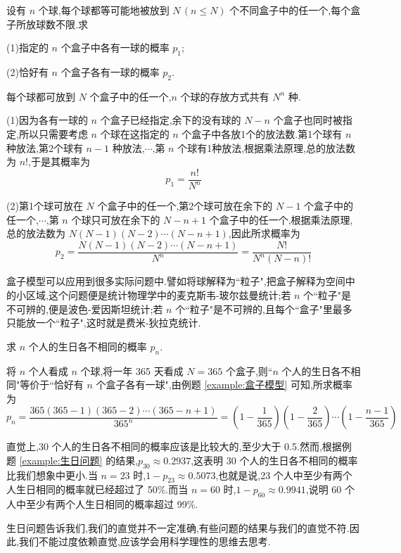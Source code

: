 \begin{example}
    \indent 设有 $n$ 个球,每个球都等可能地被放到 $N \, (n \leqslant N)$ 个不同盒子中的任一个,每个盒子所放球数不限.求

    (1)指定的 $n$ 个盒子中各有一球的概率 $p_1$;

    (2)恰好有 $n$ 个盒子各有一球的概率 $p_2$.
\end{example}

\begin{solution}
    每个球都可放到 $N$ 个盒子中的任一个,$n$ 个球的存放方式共有 $N^n$ 种.

    (1)因为各有一球的 $n$ 个盒子已经指定,余下的没有球的 $N-n$ 个盒子也同时被指定,所以只需要考虑 $n$ 个球在这指定的 $n$ 个盒子中各放1个的放法数.第1个球有 $n$ 种放法,第2个球有 $n-1$ 种放法,$\cdots$,第 $n$ 个球有1种放法,根据乘法原理,总的放法数为 $n!$,于是其概率为
    $$
    p_1 = \dfrac{n!}{N^n}
    $$

    (2)第1个球可放在 $N$ 个盒子中的任一个,第2个球可放在余下的 $N-1$ 个盒子中的任一个,$\cdots$,第 $n$ 个球只可放在余下的 $N-n+1$ 个盒子中的任一个,根据乘法原理,总的放法数为 $N (N-1) (N-2) \cdots (N-n+1)$,因此所求概率为
    $$
    p_2 = \dfrac{N (N-1) (N-2) \cdots (N-n+1)}{N^n} = \dfrac{N!}{N^n (N-n)!}
    $$
\end{solution}

\begin{note}
    \indent 盒子模型可以应用到很多实际问题中.譬如将球解释为``粒子",把盒子解释为空间中的小区域,这个问题便是统计物理学中的麦克斯韦-玻尔兹曼统计;若 $n$ 个``粒子"是不可辨的,便是波色-爱因斯坦统计;若 $n$ 个``粒子"是不可辨的,且每个``盒子"里最多只能放一个``粒子",这时就是费米-狄拉克统计.
\end{note}

\begin{example}
    \indent 求 $n$ 个人的生日各不相同的概率 $p_n$.
\end{example}

\begin{solution}
    将 $n$ 个人看成 $n$ 个球,将一年 365 天看成 $N=365$ 个盒子,则``$n$ 个人的生日各不相同"等价于``恰好有 $n$ 个盒子各有一球",由例题 \ref{example:盒子模型} 可知,所求概率为
    $$
    p_n = \dfrac{365 (365-1) (365-2) \cdots (365-n+1)}{365^n} = \left( 1 - \dfrac{1}{365} \right) \left( 1 - \dfrac{2}{365} \right) \cdots \left( 1 - \dfrac{n-1}{365} \right)
    $$
\end{solution}

\begin{note}
    \indent 直觉上,30 个人的生日各不相同的概率应该是比较大的,至少大于 0.5.然而,根据例题 \ref{example:生日问题} 的结果,$p_{30} \approx 0.2937$,这表明 30 个人的生日各不相同的概率比我们想象中更小.当 $n=23$ 时,$1 - p_{23} \approx 0.5073$,也就是说,23 个人中至少有两个人生日相同的概率就已经超过了 50\%.而当 $n=60$ 时,$1 - p_{60} \approx 0.9941$,说明 60 个人中至少有两个人生日相同的概率超过 99\%.

    生日问题告诉我们,我们的直觉并不一定准确,有些问题的结果与我们的直觉不符.因此,我们不能过度依赖直觉,应该学会用科学理性的思维去思考.
\end{note}

